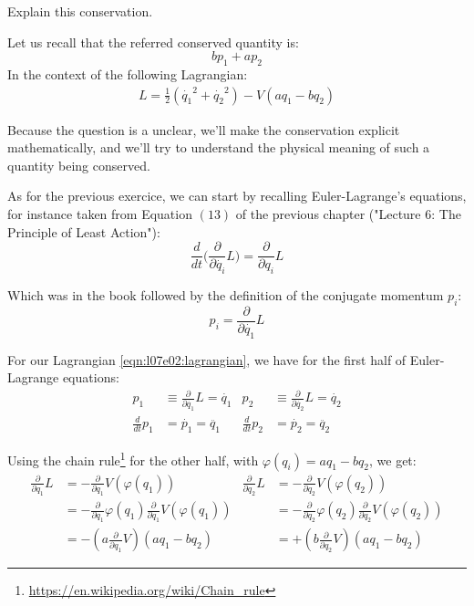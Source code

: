 \documentclass[solutions.tex]{subfiles}
\begin{document}
\maketitle
\begin{exercise}
Explain this conservation.
\end{exercise}
Let us recall that the referred conserved quantity is:
\[
	b p_1 + a p_2
\]
In the context of the following Lagrangian:
\begin{align}
	L = \frac{1}{2}(\dot{q_1}^2+\dot{q_2}^2) - V(a q_1-b q_2)
	\label{eqn:l07e02:lagrangian}
\end{align}

Because the question is a unclear, we'll make the conservation explicit
mathematically, and we'll try to understand the physical meaning
of such a quantity being conserved.

\hrr

As for the previous exercice, we can start by recalling
Euler-Lagrange's equations, for instance taken from
Equation $(13)$ of the previous chapter ("Lecture $6$:
The Principle of Least Action"):
\[
	\frac{d}{dt}\biggl(\frac{\partial}{\partial \dot{q_i}}L\biggr)
	= \frac{\partial}{\partial q_i}L
\]

Which was in the book followed by the definition of the
conjugate momentum $p_i$:
\[
	p_i = \frac{\partial}{\partial \dot{q_1}}L
\]

For our Lagrangian \eqref{eqn:l07e02:lagrangian}, we have
for the first half of Euler-Lagrange equations:
\begin{align}
	p_1 &\equiv \frac{\partial}{\partial \dot{q_1}}L = \dot{q_1} &
	p_2 &\equiv \frac{\partial}{\partial \dot{q_2}}L = \dot{q_2} \label{eqns:l07e02:p1} \\
	\frac{d}{dt}p_1 &= \dot{p_1} = \ddot{q_1} &
	\frac{d}{dt}p_2 &= \dot{p_2} = \ddot{q_2} \label{eqns:l07e02:p2}
\end{align}

Using the chain
rule\footnote{\url{https://en.wikipedia.org/wiki/Chain\_rule}}
for the other half, with $\varphi(q_i) = a q_1 - b q_2$, we get:
\begin{align}
	\frac{\partial}{\partial q_1}L &=
		-\frac{\partial}{\partial q_1}V(\varphi(q_1)) &
	\frac{\partial}{\partial q_2}L &=
		-\frac{\partial}{\partial q_2}V(\varphi(q_2)) \nonumber \\
	~ &= -\frac{\partial}{\partial q_1}\varphi(q_1)
		\frac{\partial}{\partial q_1}V(\varphi(q_1)) &
	~ &= -\frac{\partial}{\partial q_2}\varphi(q_2)
		\frac{\partial}{\partial q_2}V(\varphi(q_2)) \nonumber \\
	~ &= -(a\frac{\partial}{\partial q_1}V)(a q_1 - b q_2) &
	~ &= +(b\frac{\partial}{\partial q_2}V)(a q_1 - b q_2) \label{eqns:l07e02:p3}
\end{align}
\end{document}
